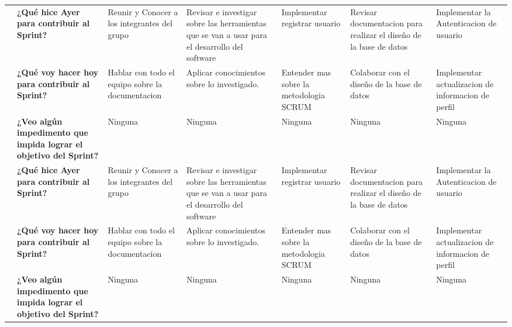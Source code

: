 \begin{longtable}{|c|P{2.5cm}|P{2cm}|P{2.5cm}|P{2.2cm}|P{2.2cm}|P{2cm}|}
    & \textbf {¿Qué hice Ayer para contribuir al Sprint?} 
    & Reunir y Conocer a los integrantes del grupo 
    & Revisar e investigar sobre las herramientas que se van a usar para el desarrollo del software 
    & Implementar registrar usuario
    & Revisar documentacion para realizar el diseño de la base de datos
    & Implementar la Autenticacion de usuario \\ 
    & \textbf {¿Qué voy hacer hoy para contribuir al Sprint?} 
    & Hablar con todo el equipo sobre la documentacion
    & Aplicar conocimientos sobre lo investigado.
    & Entender mas sobre la metodologia SCRUM
    & Colaborar con el diseño de la base de datos 
    & Implementar actualizacion  de informacion de perfil\\ 
    & \textbf {¿Veo algún impedimento que impida lograr el objetivo del Sprint?} 
    & Ninguna
    & Ninguna
    & Ninguna
    & Ninguna 
    & Ninguna\\    

    & \textbf {¿Qué hice Ayer para contribuir al Sprint?} 
    & Reunir y Conocer a los integrantes del grupo 
    & Revisar e investigar sobre las herramientas que se van a usar para el desarrollo del software 
    & Implementar registrar usuario
    & Revisar documentacion para realizar el diseño de la base de datos
    & Implementar la Autenticacion de usuario \\ 
    & \textbf {¿Qué voy hacer hoy para contribuir al Sprint?} 
    & Hablar con todo el equipo sobre la documentacion
    & Aplicar conocimientos sobre lo investigado.
    & Entender mas sobre la metodologia SCRUM
    & Colaborar con el diseño de la base de datos 
    & Implementar actualizacion  de informacion de perfil\\ 
    & \textbf {¿Veo algún impedimento que impida lograr el objetivo del Sprint?} 
    & Ninguna
    & Ninguna
    & Ninguna
    & Ninguna 
    & Ninguna\\    



\end{longtable}
